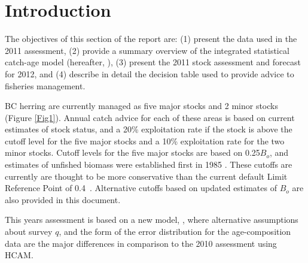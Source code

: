 

\section{Introduction}

The objectives of this section of the report are: (1) present the data used in the 2011 assessment, (2) provide a summary overview of the integrated statistical catch-age model (hereafter, \iscam), (3) present the 2011 stock assessment and forecast for 2012, and (4) describe in detail the decision table used to provide advice to fisheries management.

BC herring are currently managed as five major stocks and 2 minor stocks (Figure \ref{Fig1}).  Annual catch advice for each of these areas is based on current estimates of stock status, and a 20\% exploitation rate if the stock is above the cutoff level for the five major stocks and a 10\% exploitation rate for the two minor stocks.  Cutoff levels for the five major stocks are based on 0.25$B_o$, and estimates of unfished biomass were established first in 1985 \citep{haist1986stock}.  These cutoffs are currently are thought to be more conservative 	than the current default Limit Reference Point of 0.4\bmsy\ \citep{dfo2006}.  Alternative cutoffs based on updated estimates of $B_o$ are also provided in this document.

This years assessment is based on a new model, \iscam, where alternative assumptions about survey $q$, and the form of the error distribution for the age-composition data are the major differences in comparison to the 2010 assessment using HCAM.



